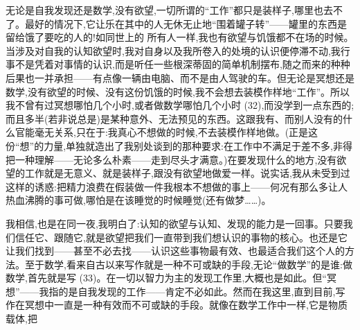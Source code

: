 无论是自我发现还是数学,没有欲望,一切所谓的“工作”都只是装样子,哪里也去不了。最好的情况下,它让乐在其中的人无休无止地“围着罐子转”——罐里的东西是留给饿了要吃的人的!如同世上的%
所有人一样,我也有欲望与饥饿都不在场的时候。当涉及对自我的认知欲望时,我对自身以及我所卷入的处境的认识便停滞不动,我行事不是凭着对事情的认识,而是听任一些根深蒂固的简单机制摆布,随之而来的种种后果也一并承担——有点像一辆由电脑、而不是由人驾驶的车。但无论是冥想还是数学,没有欲望的时候、没有这份饥饿的时候,我不会想去装模作样地“工作”。所以我不曾有过冥想哪怕几个小时,或者做数学哪怕几个小时 (32),而没学到一点东西的;而且多半(若非说总是)是某种意外、无法预见的东西。这跟我有、而别人没有的什么官能毫无关系,只在于:我真心不想做的时候,不去装模作样地做。(正是这份“想”的力量,单独就造出了我别处谈到的那种要求:在工作中不满足于差不多,非得把一种理解——无论多么朴素——走到尽头才满意。)在要发现什么的地方,没有欲望的工作就是无意义、就是装样子,跟没有欲望地做爱一样。说实话,我从未受到过这样的诱惑:把精力浪费在假装做一件我根本不想做的事上——何况有那么多让人热血沸腾的事可做,哪怕是在该睡觉的时候睡觉(还有做梦……)。

我相信,也是在同一夜,我明白了:认知的欲望与认知、发现的能力是一回事。只要我们信任它、跟随它,就是欲望把我们一直带到我们想认识的事物的核心。也还是它让我们找到——甚至不必去找——认识这些事物最有效、也最适合我们这个人的方法。至于数学,看来自古以来写作就是一种不可或缺的手段,无论“做数学”的是谁:做数学,首先就是写 (33)。在一切以智力为主的发现工作里,大概也是如此。但“冥想”——我指的是自我发现的工作——肯定不必如此。然而在我这里,直到目前,写作在冥想中一直是一种有效而不可或缺的手段。就像在数学工作中一样,它是物质载体,把
